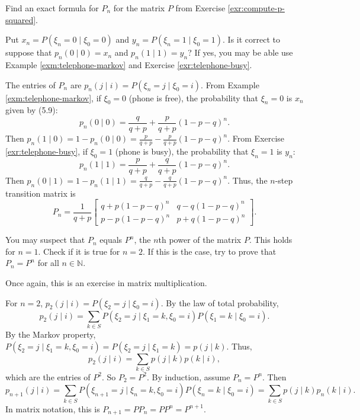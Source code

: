 \begin{Exercise}
\label{exr:find-n-step-transition}
Find an exact formula for $P_n$ for the matrix $P$ from Exercise \ref{exr:compute-p-squared}.

\begin{hint}
Put $x_n = P(\xi_n = 0 \mid \xi_0 = 0)$ and $y_n = P(\xi_n = 1 \mid \xi_0 = 1)$. Is it correct to suppose that $p_n(0 \mid 0) = x_n$ and $p_n(1 \mid 1) = y_n$? If yes, you may be able use Example \ref{exm:telephone-markov} and Exercise \ref{exr:telephone-busy}.
\end{hint}
\end{Exercise}

\begin{Solution}
The entries of $P_n$ are $p_n(j \mid i) = P(\xi_n = j \mid \xi_0 = i)$. 
From Example \ref{exm:telephone-markov}, if $\xi_0 = 0$ (phone is free), the probability that $\xi_n = 0$ is $x_n$ given by (5.9):
\[
p_n(0 \mid 0) = \frac{q}{q+p} + \frac{p}{q+p}(1-p-q)^n.
\]
Then $p_n(1 \mid 0) = 1 - p_n(0 \mid 0) = \frac{p}{q+p} - \frac{p}{q+p}(1-p-q)^n$.
From Exercise \ref{exr:telephone-busy}, if $\xi_0 = 1$ (phone is busy), the probability that $\xi_n = 1$ is $y_n$:
\[
p_n(1 \mid 1) = \frac{p}{q+p} + \frac{q}{q+p}(1-p-q)^n.
\]
Then $p_n(0 \mid 1) = 1 - p_n(1 \mid 1) = \frac{q}{q+p} - \frac{q}{q+p}(1-p-q)^n$.
Thus, the $n$-step transition matrix is
\[
P_n = \frac{1}{q+p} \begin{bmatrix} q+p(1-p-q)^n & q-q(1-p-q)^n \\ p-p(1-p-q)^n & p+q(1-p-q)^n \end{bmatrix}.
\]
\end{Solution}

\begin{Exercise}
\label{exr:pn-equals-p-power}
You may suspect that $P_n$ equals $P^n$, the $n$th power of the matrix $P$. This holds for $n=1$. Check if it is true for $n=2$. If this is the case, try to prove that $P_n = P^n$ for all $n\in\mathbb{N}$.

\begin{hint}
Once again, this is an exercise in matrix multiplication.
\end{hint}
\end{Exercise}

\begin{Solution}
For $n=2$, $p_2(j \mid i) = P(\xi_2 = j \mid \xi_0 = i)$. By the law of total probability,
\[
p_2(j \mid i) = \sum_{k \in S} P(\xi_2 = j \mid \xi_1 = k, \xi_0 = i) P(\xi_1 = k \mid \xi_0 = i).
\]
By the Markov property, $P(\xi_2 = j \mid \xi_1 = k, \xi_0 = i) = P(\xi_2 = j \mid \xi_1 = k) = p(j \mid k)$. Thus,
\[
p_2(j \mid i) = \sum_{k \in S} p(j \mid k) p(k \mid i),
\]
which are the entries of $P^2$. So $P_2 = P^2$.
By induction, assume $P_n = P^n$. Then
\[
p_{n+1}(j \mid i) = \sum_{k \in S} P(\xi_{n+1} = j \mid \xi_n = k, \xi_0 = i) P(\xi_n = k \mid \xi_0 = i) = \sum_{k \in S} p(j \mid k) p_n(k \mid i).
\]
In matrix notation, this is $P_{n+1} = P P_n = P P^n = P^{n+1}$.
\end{Solution}

